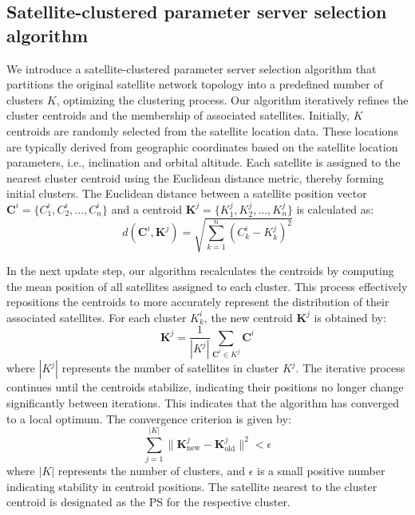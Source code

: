 \begin{comment}
The local updates from the satellite clients are then weighted and aggregated according to the weight parameter $p_i$ by:
\begin{equation}
w_{m+1} = w_m + \sum_{i \in U_k} p_i Q_m^i(w_{m+1}^{i} - w_m)
\end{equation}
\end{comment}

\subsection{Satellite-clustered parameter server selection algorithm}

We introduce a satellite-clustered parameter server selection algorithm that partitions the original satellite network topology into a predefined number of clusters $K$, optimizing the clustering process. Our algorithm iteratively refines the cluster centroids and the membership of associated satellites. Initially, $K$ centroids are randomly selected from the satellite location data. These locations are typically derived from geographic coordinates based on the satellite location parameters, i.e., inclination and orbital altitude. Each satellite is assigned to the nearest cluster centroid using the Euclidean distance metric, thereby forming initial clusters. The Euclidean distance between a satellite position vector
$\mathbf{C}^i = \{C_{1}^i, C_{2}^i, \ldots, C_{n}^i \}$ and a centroid $\mathbf{K}^j = \{K_{1}^j, K_{2}^j, \ldots, K_{n}^j \}$ is calculated as:
\begin{equation}
d(\mathbf{C}^i, \mathbf{K}^j) = \sqrt{\sum_{k=1}^{n} (C_{k}^i - K_{k}^j)^2}
\end{equation}

In the next update step, our algorithm recalculates the centroids by computing the mean position of all satellites assigned to each cluster. This process effectively repositions the centroids to more accurately represent the distribution of their associated satellites. For each cluster $K_k^i$, the new centroid $\mathbf{K}^j$ is obtained by:
\begin{equation}
\mathbf{K}^j = \frac{1}{|K^j|} \sum_{\mathbf{C}^i \in K^j} \mathbf{C}^i
\end{equation}
where $|K^j|$ represents the number of satellites in cluster $K^j$. The iterative process continues until the centroids stabilize, indicating their positions no longer change significantly between iterations. This indicates that the algorithm has converged to a local optimum. The convergence criterion is given by:
\begin{equation}
\sum_{j=1}^{|K|} \|\mathbf{K}_{\text{new}}^j - \mathbf{K}_{\text{old}}^j\|^2 < \epsilon
\end{equation}
where $|K|$ represents the number of clusters, and $\epsilon$ is a small positive number indicating stability in centroid positions.
The satellite nearest to the cluster centroid is designated as the PS for the respective cluster.


